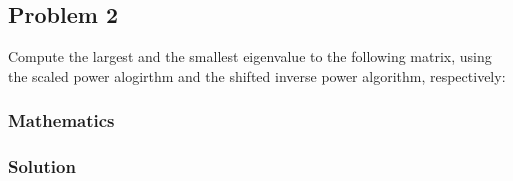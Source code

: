 \subsection{Problem 2}
\label{sec:problem_2}

Compute the largest and the smallest eigenvalue to the following matrix, using the
scaled power alogirthm and the shifted inverse power algorithm, respectively:

\subsubsection*{Mathematics}


\subsubsection*{Solution}

